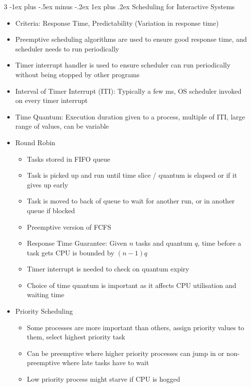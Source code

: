 \documentclass[10pt, landscape]{article}
\makeatletter
\renewcommand{\subsection}{\@startsection{subsection}{3}{0mm}%
                                {-1ex plus -.5ex minus -.2ex}%
                                {1ex plus .2ex}%
                                {\normalfont\small\bfseries}}%
\makeatother
\begin{document}
\begin{multicols*}{3}
\subsection{Scheduling for Interactive Systems}
\begin{itemize}
    \item Criteria: Response Time, Predictability (Variation in response time)
    \item Preemptive scheduling algorithms are used to ensure good response time, and scheduler needs to run periodically
    \item Timer interrupt handler is used to ensure scheduler can run periodically without being stopped by other programs
    \item Interval of Timer Interrupt (ITI): Typically a few ms, OS scheduler invoked on every timer interrupt
    \item Time Quantum: Execution duration given to a process, multiple of ITI, large range of values, can be variable
    \item Round Robin
    \begin{itemize}
        \item Tasks stored in FIFO queue
        \item Task is picked up and run until time slice / quantum is elapsed or if it gives up early
        \item Task is moved to back of queue to wait for another run, or in another queue if blocked
        \item Preemptive version of FCFS
        \item Response Time Guarantee: Given $n$ tasks and quantum $q$, time before a task gets CPU is bounded by $(n-1)q$
        \item Timer interrupt is needed to check on quantum expiry
        \item Choice of time quantum is important as it affects CPU utilisation and waiting time
    \end{itemize}
    \item Priority Scheduling
    \begin{itemize}
        \item Some processes are more important than others, assign priority values to them, select highest priority task
        \item Can be preemptive where higher priority processes can jump in or non-preemptive where late tasks have to wait
        \item Low priority process might starve if CPU is hogged

\end{itemize}
\end{itemize}
\end{multicols*}
\end{document}
